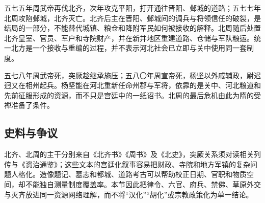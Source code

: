 五七五年周武帝再伐北齐，次年攻克平阳，打开通往晋阳、邺城的道路；五七七年北周攻陷邺城，北齐灭亡。北齐后主在晋阳、邺城间的调兵与将领信任的破裂，是结局的一部分，不能替代城镇、粮仓和降附军民如何被接收的解释。北周随后处置北齐皇室、官员、军户和寺院财产，并在新并地区重建道路、仓储与军队粮运。统一北方是一个接收与重编的过程，并不表示河北社会已立即与关中使用同一套制度。

五七八年周武帝死，突厥趁继承施压；五八〇年周宣帝死，杨坚以外戚辅政，尉迟迥又在相州起兵。杨坚能在河北重新任命州郡与军将，依靠的是关中、河北粮道和先前征服形成的资源，而不只是宫廷中的一纸诏书。北周的最后危机由此为隋的受禅准备了条件。

\subsection{史料与争议}

北齐、北周的主干分别来自《北齐书》《周书》及《北史》，突厥关系须对读相关列传与《资治通鉴》；这些文本的宫廷化叙事容易把财政、寺院和地方军镇的复杂问题人格化。造像题记、墓志和都城、道路考古可以帮助校正日期、官职和物质空间，却不能独自测量制度覆盖率。本节因此把律令、六官、府兵、禁佛、草原外交与灭齐放进同一资源网络理解，而不将“汉化”“胡化”或宗教政策化为单一结论。
